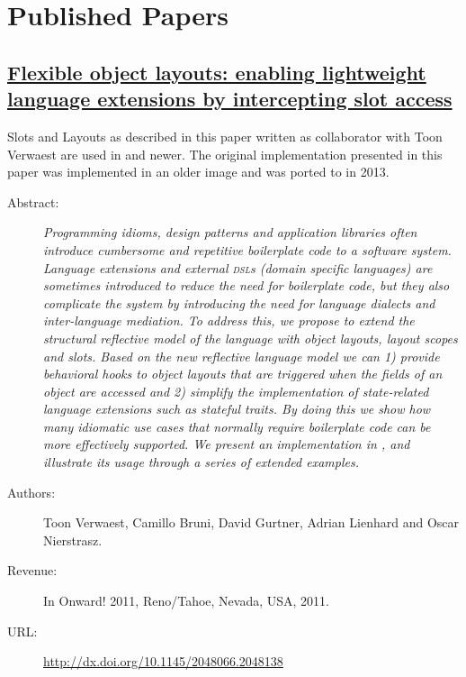 \section{Published Papers}

\subsection*{\href{http://dx.doi.org/10.1145/2048066.2048138}{Flexible object layouts: enabling lightweight language extensions by intercepting slot access}}

Slots and Layouts as described in this paper written as collaborator with Toon Verwaest are used in  and newer.
The original implementation presented in this paper was implemented in an older  image and was ported to  in 2013.

\begin{description}
	\item[Abstract:] \emph{
Programming idioms, design patterns and application libraries often introduce cumbersome and repetitive boilerplate code to a software system.
Language extensions and external \textsc{dsl}s (domain specific languages) are sometimes introduced to reduce the need for boilerplate code, but they also complicate the system by introducing the need for language dialects and inter-language mediation.
To address this, we propose to extend the structural reflective model of the language with object layouts, layout scopes and slots.
Based on the new reflective language model we can 1) provide behavioral hooks to object layouts that are triggered when the fields of an object are accessed and 2) simplify the implementation of state-related language extensions such as stateful traits.
By doing this we show how many idiomatic use cases that normally require boilerplate code can be more effectively supported.
We present an implementation in \ST, and illustrate its usage through a series of extended examples.}

	\item[Authors:] Toon Verwaest, Camillo Bruni, David Gurtner, Adrian Lienhard and Oscar Nierstrasz. 
	\item[Revenue:] In Onward! 2011, Reno/Tahoe, Nevada, USA, 2011.
	\item[URL:] \url{http://dx.doi.org/10.1145/2048066.2048138}
\end{description}

